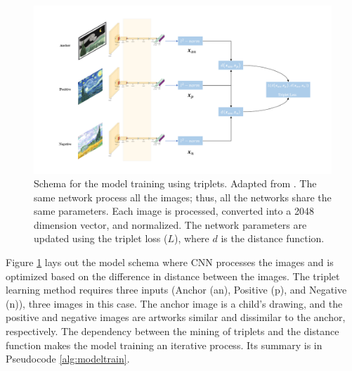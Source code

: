 \begin{figure}[ht]
\centering
\includegraphics[width=\textwidth]{images/triplet_network/triplet_learning.png}
  \caption{Schema for the model training using triplets. Adapted from \cite{Seguin2018MakingLA}. The same network process all the images; thus, all the networks share the same parameters. Each image is processed, converted into a 2048 dimension vector, and normalized. The network parameters are updated using the triplet loss (\begin{math} L \end{math}), where \begin{math} d \end{math} is the distance function.}
  \label{fig:triplet-network}
\end{figure}


Figure \ref{fig:triplet-network} lays out the model schema where CNN processes the images and is optimized based on the difference in distance between the images. The triplet learning method requires three inputs (Anchor (an), Positive (p), and Negative (n)), three images in this case. The anchor image is a child's drawing, and the positive and negative images are artworks similar and dissimilar to the anchor, respectively. The dependency between the mining of triplets and the distance function makes the model training an iterative process. Its summary is in Pseudocode \ref{alg:modeltrain}.


